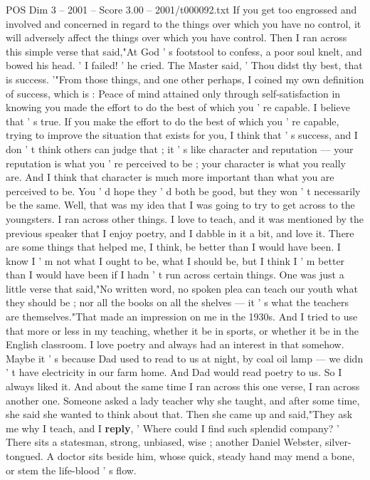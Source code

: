 \begin{textsample}{POS Dim 3 – 2001 – Score 3.00 – 2001/t000092.txt}
If you get too engrossed and involved and concerned in regard to the things over which you have no control, it will adversely affect the things over which you have control.
Then I ran across this simple verse that said,"At God ' s footstool to confess, a poor soul knelt, and bowed his head. ' I failed! ' he cried.
The Master said, ' Thou didst thy best, that is success. '"From those things, and one other perhaps, I coined my own definition of success, which is : Peace of mind attained only through self-satisfaction in knowing you made the effort to do the best of which you ' re capable.
I believe that ' s true.
If you make the effort to do the best of which you ' re capable, trying to improve the situation that exists for you, I think that ' s success, and I don ' t think others can judge that ; it ' s like character and reputation — your reputation is what you ' re perceived to be ; your character is what you really are.
And I think that character is much more important than what you are perceived to be.
You ' d hope they ' d both be good, but they won ' t necessarily be the same.
Well, that was my idea that I was going to try to get across to the youngsters.
I ran across other things.
I love to teach, and it was mentioned by the previous speaker that I enjoy poetry, and I dabble in it a bit, and love it.
There are some things that helped me, I think, be better than I would have been.
I know I ' m not what I ought to be, what I should be, but I think I ' m better than I would have been if I hadn ' t run across certain things.
One was just a little verse that said,"No written word, no spoken plea can teach our youth what they should be ; nor all the books on all the shelves — it ' s what the teachers are themselves."That made an impression on me in the 1930s.
And I tried to use that more or less in my teaching, whether it be in sports, or whether it be in the English classroom.
I love poetry and always had an interest in that somehow.
Maybe it ' s because Dad used to read to us at night, by coal oil lamp — we didn ' t have electricity in our farm home.
And Dad would read poetry to us.
So I always liked it.
And about the same time I ran across this one verse, I ran across another one.
Someone asked a lady teacher why she taught, and after some time, she said she wanted to think about that.
Then she came up and said,"They ask me why I teach, and I \textbf{reply}, ' Where could I find such splendid company? ' There sits a statesman, strong, unbiased, wise ; another Daniel Webster, silver-tongued.
A doctor sits beside him, whose quick, steady hand may mend a bone, or stem the life-blood ' s flow.

\end{textsample}
